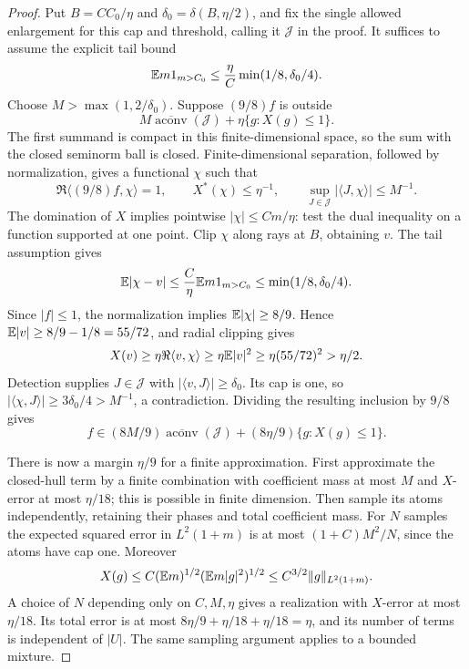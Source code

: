 \begin{proof}
Put $B=CC_0/\eta$ and $\delta_0=\delta(B,\eta/2)$, and fix the
single allowed enlargement for this cap and threshold, calling it
$\mathcal J$ in the proof.  It suffices to assume the explicit tail bound
\[
 \mathbb E m1_{m>C_0}\le\frac\eta C\min(1/8,\delta_0/4).
\]
Choose $M>\max(1,2/\delta_0)$.  Suppose $(9/8)f$ is outside
\[
 M\overline{\operatorname{aconv}}(\mathcal J)
                   +\eta\{g:X(g)\le1\}.
\]
The first summand is compact in this finite-dimensional space, so
the sum with the closed seminorm ball is closed.
Finite-dimensional separation, followed by normalization, gives a
functional $\chi$ such that
\[
 \Re\langle (9/8)f,\chi\rangle=1,\qquad
 X^*(\chi)\le\eta^{-1},\qquad
 \sup_{J\in\mathcal J}|\langle J,\chi\rangle|\le M^{-1}.
\]
The domination of $X$ implies pointwise
$|\chi|\le C m/\eta$: test the dual inequality on a function
supported at one point.  Clip $\chi$ along rays at $B$, obtaining
$v$.  The tail assumption gives
\[
 \mathbb E|\chi-v|\le\frac C\eta\mathbb E m1_{m>C_0}
                \le\min(1/8,\delta_0/4).
\]
Since $|f|\le1$, the normalization implies $\mathbb E|\chi|\ge8/9$.
Hence $\mathbb E|v|\ge8/9-1/8=55/72$, and radial clipping gives
\[
 X(v)\ge\eta\Re\langle v,\chi\rangle
       \ge\eta\mathbb E|v|^2\ge\eta(55/72)^2>\eta/2.
\]
Detection supplies $J\in\mathcal J$ with
$|\langle v,J\rangle|\ge\delta_0$.  Its cap is one, so
$|\langle\chi,J\rangle|\ge3\delta_0/4>M^{-1}$, a contradiction.
Dividing the resulting inclusion by $9/8$ gives
\[
 f\in (8M/9)\overline{\operatorname{aconv}}(\mathcal J)
                     +(8\eta/9)\{g:X(g)\le1\}.
\]

There is now a margin $\eta/9$ for a finite approximation.  First
approximate the closed-hull term by a finite combination with
coefficient mass at most $M$ and $X$-error at most $\eta/18$;
this is possible in finite dimension.  Then sample its atoms
independently, retaining their phases and total coefficient mass.
For $N$ samples the expected squared error in $L^2(1+m)$ is at most
$(1+C)M^2/N$, since the atoms have cap one.  Moreover
\[
 X(g)\le C(\mathbb E m)^{1/2}(\mathbb E m|g|^2)^{1/2}
                    \le C^{3/2}\|g\|_{L^2(1+m)}.
\]
A choice of $N$ depending only on $C,M,\eta$ gives a realization
with $X$-error at most $\eta/18$.  Its total error is at most
$8\eta/9+\eta/18+\eta/18=\eta$, and its number of terms is
independent of $|U|$.  The same sampling argument applies to a
bounded mixture.
\end{proof}

